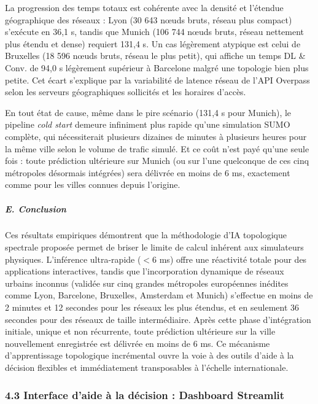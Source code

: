\documentclass[10pt, a4paper]{article}
\begin{document}
La progression des temps totaux est cohérente avec la densité et
l'étendue géographique des réseaux : Lyon (30 643 nœuds bruts, réseau
plus compact) s'exécute en 36,1 s, tandis que Munich (106 744 nœuds
bruts, réseau nettement plus étendu et dense) requiert 131,4 s. Un cas
légèrement atypique est celui de Bruxelles (18 596 nœuds bruts, réseau
le plus petit), qui affiche un temps DL \& Conv. de 94,0 s légèrement
supérieur à Barcelone malgré une topologie bien plus petite. Cet écart
s'explique par la variabilité de latence réseau de l'API Overpass selon
les serveurs géographiques sollicités et les horaires d'accès.

En tout état de cause, même dans le pire scénario (131,4 s pour Munich),
le pipeline \emph{cold start} demeure infiniment plus rapide qu'une
simulation SUMO complète, qui nécessiterait plusieurs dizaines de
minutes à plusieurs heures pour la même ville selon le volume de trafic
simulé. Et ce coût n'est payé qu'une seule fois : toute prédiction
ultérieure sur Munich (ou sur l'une quelconque de ces cinq métropoles
désormais intégrées) sera délivrée en moins de 6 ms, exactement comme
pour les villes connues depuis l'origine.

\subparagraph{E. Conclusion}\label{e.-conclusion}

Ces résultats empiriques démontrent que la méthodologie d'IA topologique
spectrale proposée permet de briser le limite de calcul inhérent aux
simulateurs physiques. L'inférence ultra-rapide (\(<6\) ms) offre une
réactivité totale pour des applications interactives, tandis que
l'incorporation dynamique de réseaux urbains inconnus (validée sur cinq
grandes métropoles européennes inédites comme Lyon, Barcelone,
Bruxelles, Amsterdam et Munich) s'effectue en moins de 2 minutes et 12
secondes pour les réseaux les plus étendus, et en seulement 36 secondes
pour des réseaux de taille intermédiaire. Après cette phase
d'intégration initiale, unique et non récurrente, toute prédiction
ultérieure sur la ville nouvellement enregistrée est délivrée en moins
de 6 ms. Ce mécanisme d'apprentissage topologique incrémental ouvre la
voie à des outils d'aide à la décision flexibles et immédiatement
transposables à l'échelle internationale.

\subsubsection{4.3 Interface d'aide à la décision : Dashboard
Streamlit}\label{interface-daide-uxe0-la-duxe9cision-dashboard-streamlit}
\end{document}
